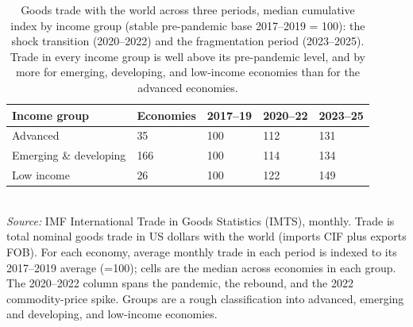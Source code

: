 \begin{table}[H]
\centering\small
\caption{Goods trade with the world across three periods, median cumulative index by income group (stable pre-pandemic base 2017--2019 = 100): the shock transition (2020--2022) and the fragmentation period (2023--2025). Trade in every income group is well above its pre-pandemic level, and by more for emerging, developing, and low-income economies than for the advanced economies.}
\label{tab:income}
\begin{tabularx}{\textwidth}{@{}lYYYY@{}}
\toprule
Income group & Economies & 2017--19 & 2020--22 & 2023--25 \\ \midrule
Advanced & 35 & 100 & 112 & 131 \\
Emerging \& developing & 166 & 100 & 114 & 134 \\
Low income & 26 & 100 & 122 & 149 \\
\bottomrule
\end{tabularx}
\\[2pt]\footnotesize{\emph{Source:} IMF International Trade in Goods Statistics (IMTS), monthly. Trade is total nominal goods trade in US dollars with the world (imports CIF plus exports FOB). For each economy, average monthly trade in each period is indexed to its 2017--2019 average (=100); cells are the median across economies in each group. The 2020--2022 column spans the pandemic, the rebound, and the 2022 commodity-price spike. Groups are a rough classification into advanced, emerging and developing, and low-income economies.}
\end{table}
